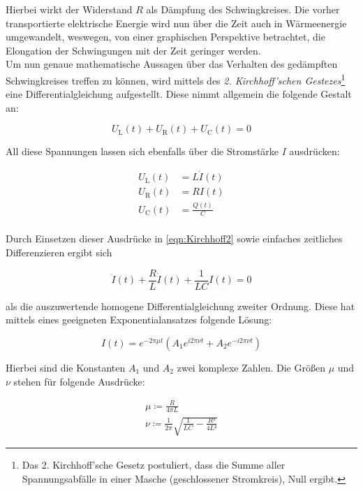 \noindent Hierbei wirkt der Widerstand $R$ als Dämpfung des Schwingkreises. Die vorher transportierte elektrische Energie wird nun 
über die Zeit auch in Wärmeenergie umgewandelt, weswegen, von einer graphischen Perspektive betrachtet, die Elongation der 
Schwingungen mit der Zeit geringer werden.\\
Um nun genaue mathematische Aussagen über das Verhalten des gedämpften Schwingkreises treffen zu können, wird mittels des 
\emph{2. Kirchhoff'schen Gestezes}\footnote{Das 2. Kirchhoff'sche Gesetz postuliert, dass die Summe aller Spannungsabfälle
in einer Masche (geschlossener Stromkreis), Null ergibt.} eine Differentialgleichung aufgestellt. Diese nimmt 
allgemein die folgende Gestalt an:

\begin{equation}
\label{eqn:Kirchhoff2}
    U_\text{L}(t) + U_\text{R}(t) + U_\text{C}(t) = 0
\end{equation}

\noindent All diese Spannungen lassen sich ebenfalls über die Stromstärke $I$ ausdrücken:

\begin{align*}
    U_\text{L}(t) &= L\dot{I}(t) \\
    U_\text{R}(t) &= RI(t) \\
    U_\text{C}(t) &= \frac{Q(t)}{C} \\
\end{align*}

\noindent Durch Einsetzen dieser Ausdrücke in \eqref{eqn:Kirchhoff2} sowie einfaches zeitliches Differenzieren ergibt sich

\begin{equation*}
    \ddot{I}(t) + \frac{R}{L}\dot{I}(t) + \frac{1}{LC}I(t) = 0
\end{equation*}

\noindent als die auszuwertende homogene Differentialgleichung zweiter Ordnung. Diese hat mittels eines geeigneten Exponentialansatzes 
folgende Lösung:

\begin{equation}
\label{eqn:solutionDGL}
    I(t) = e^{-2\pi\mu{}t}\left(A_1e^{i2\pi\nu{}t} + A_2e^{-i2\pi\nu{}t}\right)
\end{equation}

\noindent Hierbei sind die Konstanten $A_1$ und $A_2$ zwei komplexe Zahlen. Die Größen $\mu$ und $\nu$ stehen 
für folgende Ausdrücke:

\begin{gather*}
    \mu \coloneqq \frac{R}{4\pi{}L} \\
    \nu \coloneqq \frac{1}{2\pi}\sqrt{\frac{1}{LC} - \frac{R²}{4L²}}
\end{gather*}
